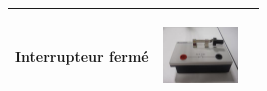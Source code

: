 \documentclass[11pt]{article}
\begin{document}
\begin{center}
\begin{tabular}{ |p{6cm}|p{6cm}|p{6cm}|  }
			  Interrupteur fermé 			&  
			  \begin{minipage}{.3\textwidth}
				  \begin{center}
					  \includegraphics[width=2cm]{interrupteur_fermé.jpg}
				  \end{center}
				\end{minipage}  &  \\\hline
  



			\end{tabular}
		\end{center}
\end{document}
